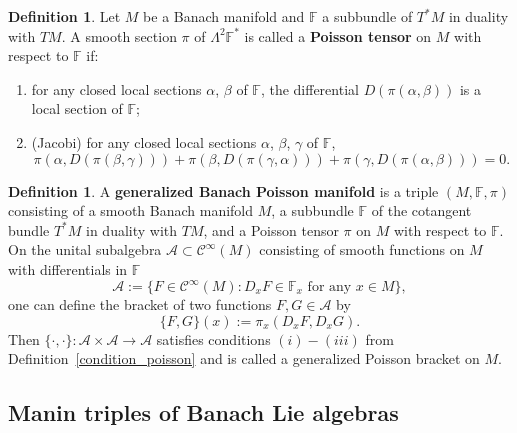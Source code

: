 \documentclass[a4paper,12pt,reqno]{amsart}%
\theoremstyle{definition}
\newtheorem{definition}[theorem]{Definition}
\theoremstyle{remark}
\numberwithin{theorem}{section}
\numberwithin{equation}{section}
\newcommand{\1}{{\bf 1}}
\newcommand{\Cp}{\mathscr{C}}
\begin{document}
\begin{definition}\label{Poisson_tensor}
Let $M$ be a Banach manifold and $\mathbb{F}$ a subbundle of $T^*M$ in duality with $TM$. A smooth section $\pi$ of $\Lambda^2\mathbb{F}^*$  is called a \textbf{Poisson tensor} on $M$ with respect to $\mathbb{F}$ if:
\begin{enumerate}
\item for any closed local sections $\alpha$, $\beta$ of  $\mathbb{F}$, the differential $D\left(\pi(\alpha, \beta)\right)$ is a local section of $\mathbb{F}$;
\item (Jacobi) for any closed local sections $\alpha$, $\beta$, $\gamma$ of $\mathbb{F}$,
\begin{equation}\label{Jacobi_Poisson}
\pi\left(\alpha, D\left(\pi(\beta, \gamma)\right)\right) + \pi\left(\beta, D\left(\pi(\gamma, \alpha)\right)\right) + \pi\left(\gamma, D\left(\pi(\alpha, \beta)\right) \right)= 0.
\end{equation}
\end{enumerate}
\end{definition}

\begin{definition}\label{Poisson-Manifold}
A \textbf{generalized Banach Poisson manifold} is a triple $(M, \mathbb{F}, \pi)$ consisting of a smooth Banach manifold $M$, a subbundle $\mathbb{F}$ of the cotangent bundle $T^*M$ in duality with $TM$, and a Poisson tensor $\pi$ on $M$ with respect to $\mathbb{F}$. On the unital subalgebra $\mathcal{A}\subset\Cp^{\infty}(M)$ consisting of smooth functions on $M$ with differentials in $\mathbb F$
\begin{equation}\label{A}
\mathcal{A} :=\{ F \in \Cp^\infty(M): D_xF \in \mathbb F_x \textrm{ for any }x\in M\},
\end{equation}
one can define the bracket of two functions $F, G\in\mathcal{A}$ by
\begin{equation}\label{pipoisson}
\{F, G\}(x) := \pi_x(D_xF, D_xG).
\end{equation}
Then $\{\cdot,\cdot\}:\mathcal{A}\times\mathcal{A}\rightarrow\mathcal{A}$ satisfies conditions $(i)-(iii)$ from Definition~\ref{condition_poisson} and is called a generalized Poisson bracket on $M$. 
\end{definition}

\subsection{Manin triples of Banach Lie algebras}
\end{document}
